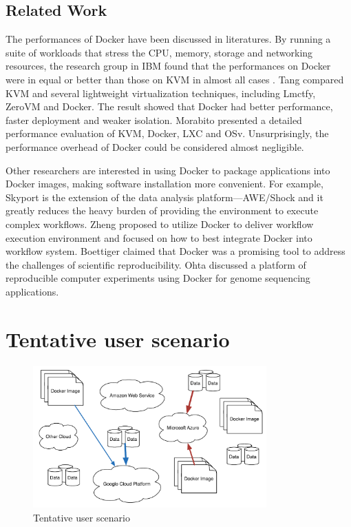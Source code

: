 \documentclass{ieicej}
\begin{document}
\subsection{Related Work}
The performances of Docker have been discussed in literatures. By running a suite of workloads that stress the CPU, memory, storage and networking resources, the research group in IBM found that the performances on Docker were in equal or better than those on KVM in almost all cases \cite{felter2014updated}.  Tang \cite{tang2014performance} compared KVM and several lightweight virtualization techniques, including Lmctfy, ZeroVM and Docker. The result showed that Docker had better performance, faster deployment and weaker isolation. Morabito \cite{morabito2015hypervisors} presented a detailed performance evaluation of KVM, Docker, LXC and OSv. Unsurprisingly, the performance overhead of Docker could be considered almost negligible.


Other researchers are interested in using Docker to package applications into Docker images, making software installation more convenient. For example, Skyport \cite{gerlach2014skyport} is the extension of the data analysis platform---AWE/Shock and it greatly reduces the heavy burden of providing the environment to execute complex workflows. Zheng \cite{zheng2015integrating} proposed to utilize Docker to deliver workflow execution environment and focused on how to best integrate Docker into workflow system. Boettiger \cite{boettiger2015introduction} claimed that Docker was a promising tool to address the challenges of scientific reproducibility. Ohta \cite{tazro2015read} discussed a platform of reproducible computer experiments using Docker for genome sequencing applications.

\section{Tentative user scenario}


\begin{figure}
  \begin{center}
  \includegraphics[width=0.8\textwidth,natwidth=1000,natheight=450]{1_Tentative_user_scenario.pdf}
  \end{center}
  \caption{Tentative user scenario}
  \label{tentative_user_scenario}
\end{figure}
\end{document}
